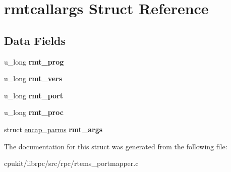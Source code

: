 \hypertarget{structrmtcallargs}{}\section{rmtcallargs Struct Reference}
\label{structrmtcallargs}
\subsection*{Data Fields}
\begin{DoxyCompactItemize}
\item 
\mbox{\label{structrmtcallargs_a11ce6c8dcf07a386be68864a8997a9df}} 
u\+\_\+long {\bfseries rmt\+\_\+prog}
\item 
\mbox{\label{structrmtcallargs_a2c114996657528775b1d4b0ae2514522}} 
u\+\_\+long {\bfseries rmt\+\_\+vers}
\item 
\mbox{\label{structrmtcallargs_a77368feea5f3a207fd25f48d746300f8}} 
u\+\_\+long {\bfseries rmt\+\_\+port}
\item 
\mbox{\label{structrmtcallargs_a9fe6df069b78a49ee0f74d9b213e5bcb}} 
u\+\_\+long {\bfseries rmt\+\_\+proc}
\item 
\mbox{\label{structrmtcallargs_a7524b393155b572c94ced217bf41d1b7}} 
struct \mbox{\hyperlink{structencap__parms}{encap\+\_\+parms}} {\bfseries rmt\+\_\+args}
\end{DoxyCompactItemize}


The documentation for this struct was generated from the following file\+:\begin{DoxyCompactItemize}
\item 
cpukit/librpc/src/rpc/rtems\+\_\+portmapper.\+c\end{DoxyCompactItemize}
